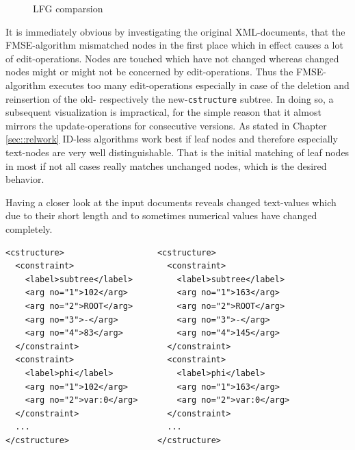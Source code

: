 \begin{figure}[tb]
\caption{\label{fig:lfg} LFG comparsion}
\end{figure}

It is immediately obvious by investigating the original XML-documents, that the FMSE-algorithm mismatched nodes in the first place which in effect causes a lot of edit-operations. Nodes are touched which have not changed whereas changed nodes might or might not be concerned by edit-operations. Thus the FMSE-algorithm executes too many edit-operations especially in case of the deletion and reinsertion of the old- respectively the new-\texttt{cstructure} subtree. In doing so, a subsequent visualization is impractical, for the simple reason that it almost mirrors the update-operations for consecutive versions. As stated in Chapter \ref{sec::relwork} ID-less algorithms work best if leaf nodes and therefore especially text-nodes are very well distinguishable. That is the initial matching of leaf nodes in most if not all cases really matches unchanged nodes, which is the desired behavior. 

Having a closer look at the input documents reveals changed text-values which due to their short length and to sometimes numerical values have changed completely.

\begin{lstlisting}[caption=CStructure/FStructure comparsion]
<cstructure>                   <cstructure>
  <constraint>                   <constraint>
    <label>subtree</label>         <label>subtree</label>
    <arg no="1">102</arg>          <arg no="1">163</arg>
    <arg no="2">ROOT</arg>         <arg no="2">ROOT</arg>   
    <arg no="3">-</arg>            <arg no="3">-</arg>
    <arg no="4">83</arg>           <arg no="4">145</arg>
  </constraint>                  </constraint>
  <constraint>                   <constraint>
    <label>phi</label>             <label>phi</label>
    <arg no="1">102</arg>          <arg no="1">163</arg>
    <arg no="2">var:0</arg>        <arg no="2">var:0</arg>
  </constraint>                  </constraint>
  ...                            ...
</cstructure>                  </cstructure>
\end{lstlisting}
\label{lst:linguistscomparsion}


